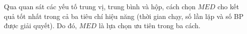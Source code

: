 \documentclass[../main.tex]{subfiles}
\begin{document}
Qua quan sát các yếu tố trung vị, trung bình và hộp, cách chọn \(MED\) cho kết quả tốt nhất trong cả ba tiêu
chí hiệu năng (thời gian chạy, số lần lặp và số BP được giải quyết). 
Do đó, \(MED\) là lựa chọn ưu tiên trong ba cách.






\end{document}
